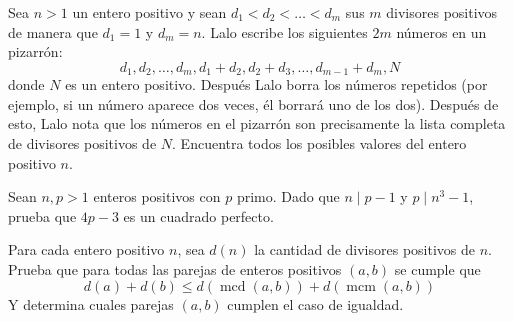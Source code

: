 \documentclass[11pt]{scrartcl}
\newcommand{\mcd}{\operatorname{mcd}}
\newcommand{\mcm}{\operatorname{mcm}}
\begin{document}
\begin{problem} %

    Sea $n>1$ un entero positivo y sean $d_1< d_2< \dots < d_m$ sus $m$ divisores positivos de manera que $d_1=1$ y $d_m=n$. Lalo escribe los siguientes $2m$ números en un pizarrón:
\[d_1,d_2,\dots,d_m,d_1+d_2,d_2+d_3,\dots,d_{m-1}+d_m,N\]
donde $N$ es un entero positivo. Después Lalo borra los números repetidos (por ejemplo, si un número aparece dos veces, él borrará uno de los dos). Después de esto, Lalo nota que los números en el pizarrón son precisamente la lista completa de divisores positivos de $N$. Encuentra todos los posibles valores del entero positivo $n$.
    
\end{problem}


\begin{problem}
Sean $n, p> 1$ enteros positivos con $p$ primo. Dado que $n \mid p-1$ y $p \mid n^3-1$, prueba que $4p-3$ es un cuadrado perfecto.
\end{problem}

\begin{problem} %
Para cada entero positivo $n$, sea $d(n)$ la cantidad de divisores positivos de $n$. \\
Prueba que para todas las parejas de enteros positivos $(a,b)$ se cumple que 
\[d(a)+d(b) \leq d(\mcd(a,b))+d(\mcm(a,b))\]
Y determina cuales parejas $(a,b)$ cumplen el caso de igualdad.
\end{problem}
\end{document}
